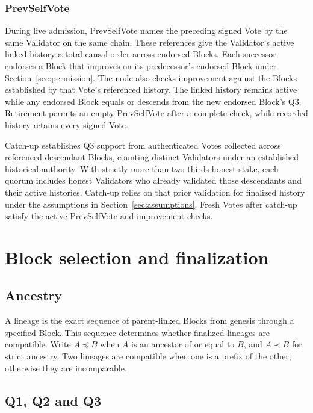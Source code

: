 \subsubsection{PrevSelfVote}\label{sec:segments}

During live admission, PrevSelfVote names the preceding signed Vote by the same Validator on the same chain.
These references give the Validator's active linked history a total causal order across endorsed Blocks.
Each successor endorses a Block that improves on its predecessor's endorsed Block under Section~\ref{sec:permission}.
The node also checks improvement against the Blocks established by that Vote's referenced history.
The linked history remains active while any endorsed Block equals or descends from the new endorsed Block's Q3.
Retirement permits an empty PrevSelfVote after a complete check, while recorded history retains every signed Vote.

Catch-up establishes Q3 support from authenticated Votes collected across referenced descendant Blocks, counting distinct Validators under an established historical authority.
With strictly more than two thirds honest stake, each quorum includes honest Validators who already validated those descendants and their active histories.
Catch-up relies on that prior validation for finalized history under the assumptions in Section~\ref{sec:assumptions}.
Fresh Votes after catch-up satisfy the active PrevSelfVote and improvement checks.

\section{Block selection and finalization}

\subsection{Ancestry}

A lineage is the exact sequence of parent-linked Blocks from genesis through a specified Block.
This sequence determines whether finalized lineages are compatible.
Write $A\preceq B$ when $A$ is an ancestor of or equal to $B$, and $A\prec B$ for strict ancestry.
Two lineages are compatible when one is a prefix of the other; otherwise they are incomparable.

\subsection{Q1, Q2 and Q3}\label{sec:quorums}

